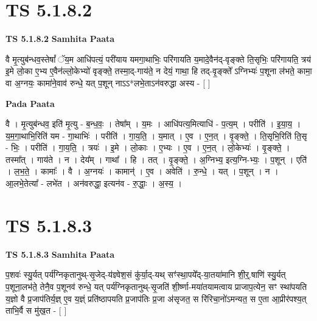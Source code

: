 \documentclass[17pt]{extarticle}
\begin{document}
\section*{ TS 5.1.8.2 }

\textbf{TS 5.1.8.2 } \newline
\textbf{Samhita Paata} \newline

वै मृ॒त्युब॑न्धव॒स्तेषां᳚ ॅय॒म आधि॑पत्यं॒ परी॑याय यमगा॒थाभिः॒ परि॑गायति य॒मादे॒वैन॑द्-वृङ्क्ते ति॒सृभिः॒ परि॑गायति॒ त्रय॑ इ॒मे लो॒का ए॒भ्य ए॒वैन॑ल्लो॒केभ्यो॑ वृङ्क्ते॒ तस्मा॒द्-गाय॑ते॒ न देयं॒ गाथा॒ हि तद्-वृ॒ङ्क्ते᳚ ऽग्निभ्यः॑ प॒शूना ल॑भते॒ कामा॒ वा अ॒ग्नयः॒ कामा॑ने॒वाव॑ रुन्धे॒ यत् प॒शून् नाऽऽ*लभे॒ताऽन॑वरुद्धा अस्य - [  ] \newline

\textbf{Pada Paata} \newline

वै । मृ॒त्युब॑न्धव॒ इति॑ मृ॒त्यु - ब॒न्ध॒वः॒ । तेषा᳚म् । य॒मः । आधि॑पत्य॒मित्याधि॑ - प॒त्य॒म् । परीति॑ । इ॒या॒य॒ । य॒म॒गा॒थाभि॒रिति॑ यम - गा॒थाभिः॑ । परीति॑ । गा॒य॒ति॒ । य॒मात् । ए॒व । ए॒न॒त् । वृ॒ङ्क्ते॒ । ति॒सृभि॒रिति॑ ति॒सृ - भिः॒ । परीति॑ । गा॒य॒ति॒ । त्रयः॑ । इ॒मे । लो॒काः । ए॒भ्यः । ए॒व । ए॒न॒त् । लो॒केभ्यः॑ । वृ॒ङ्क्ते॒ । तस्मा᳚त् । गाय॑ते । न । देय᳚म् । गाथा᳚ । हि । तत् । वृ॒ङ्क्ते॒ । अ॒ग्निभ्य॒ इत्य॒ग्नि-भ्यः॒ । प॒शून् । एति॑ । ल॒भ॒ते॒ । कामाः᳚ । वै । अ॒ग्नयः॑ । कामान्॑ । ए॒व । अवेति॑ । रु॒न्धे॒ । यत् । प॒शून् । न । आ॒लभे॒तेत्या᳚ - लभे॑त । अन॑वरुद्धा॒ इत्यन॑व - रु॒द्धाः॒ । अ॒स्य॒ ।  \newline




\section*{ TS 5.1.8.3 }

\textbf{TS 5.1.8.3 } \newline
\textbf{Samhita Paata} \newline

प॒शवः॑ स्यु॒र्यत् पर्य॑ग्निकृतानुथ्-सृ॒जेद्-य॑ज्ञ्वेश॒सं कु॑र्या॒द्-यथ् सꣳ॑स्था॒पये᳚द्-या॒तया॑मानि शी॒र्॒.षाणि॑ स्यु॒र्यत् प॒शूना॒लभ॑ते॒ तेनै॒व प॒शूनव॑ रुन्धे॒ यत् पर्य॑ग्निकृतानुथ्-सृ॒जति॑ शी॒र्ष्णा-मया॑तयामत्वाय प्राजाप॒त्येन॒ सꣳ स्था॑पयति य॒ज्ञो वै प्र॒जाप॑तिर्य॒ज्ञ् ए॒व य॒ज्ञ्ं प्रति॑ष्ठापयति प्र॒जाप॑तिः प्र॒जा अ॑सृजत॒ स रि॑रिचा॒नो॑ऽमन्यत॒ स ए॒ता आ॒प्रीर॑पश्य॒त् ताभि॒र्वै स मु॑ख॒त - [  ] \newline
\end{document}
